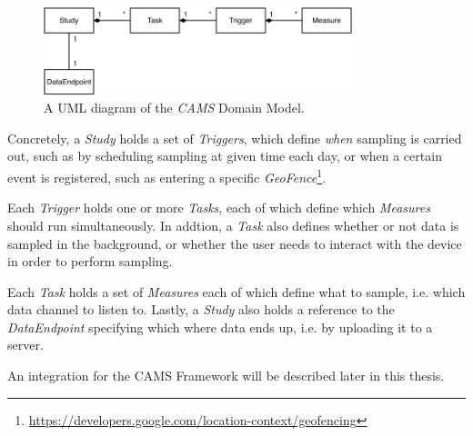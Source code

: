 \begin{figure}[h]
    \centering
    \includegraphics[width=0.8\textwidth]{images/CAMS-UML.pdf}
    \caption{A UML diagram of the \textit{CAMS} Domain Model.}
    \label{fig:cams_uml}
\end{figure}

Concretely, a \textit{Study} holds a set of \textit{Triggers}, which define \textit{when} sampling is carried out, such as by scheduling sampling at  given time each day, or when a certain event is registered, such as entering a specific \textit{GeoFence}\footnote{\url{https://developers.google.com/location-context/geofencing}}. 

Each \textit{Trigger} holds one or more \textit{Tasks}, each of which define which \textit{Measures} should run simultaneously. In addtion, a \textit{Task} also defines whether or not data is sampled in the background, or whether the user needs to interact with the device in order to perform sampling. 

Each \textit{Task} holds a set of \textit{Measures} each of which define what to sample, i.e. which data channel to listen to. Lastly, a \textit{Study} also holds a reference to the \textit{DataEndpoint} specifying which where data ends up, i.e. by uploading it to a server.

An integration for the CAMS Framework will be described later in this thesis. 